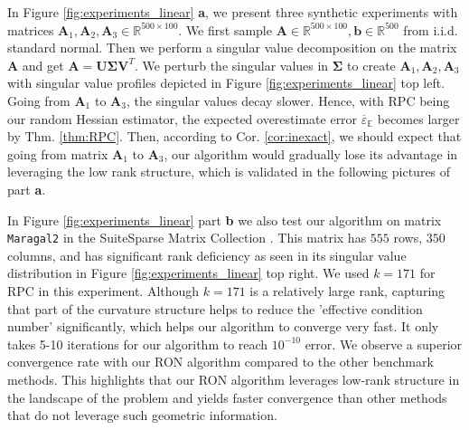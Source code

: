 \documentclass[11pt]{amsart}
\theoremstyle{plain}
\theoremstyle{definition}
\theoremstyle{remark}
\def\R{\mathbb{R}}
\def\E{\mathbb{E}}
\def\eps{\varepsilon}
\def\A{\mathbf{A}}
\begin{document}
In Figure \ref{fig:experiments_linear} \textbf{a}, we present three synthetic experiments with matrices $\A_{1},\A_{2},\A_{3}\in\R^{500\times 100}$. We first sample $\A\in \R^{500\times 100}, \mathbf{b}\in \R^{500}$ from i.i.d. standard normal. Then we perform a singular value decomposition on the matrix $\A$ and get $\A=\mathbf{U}\mathbf{\Sigma}\mathbf{V}^T.$ We perturb the singular values in $\mathbf{\Sigma}$ to create  $\A_{1},\A_{2},\A_{3}$ with singular value profiles depicted in Figure \ref{fig:experiments_linear} top left. Going from $\A_{1}$ to $\A_{3}$, the singular values decay slower. Hence, with RPC being our random Hessian estimator, the expected overestimate error $\overline{\eps}_{\E}$ becomes larger by Thm. \ref{thm:RPC}. Then, according to Cor. \ref{cor:inexact}, we should expect that going from matrix $\A_1$ to $\A_3$, our algorithm would gradually lose its advantage in leveraging the low rank structure, which is validated in the following pictures of part \textbf{a}.

In Figure \ref{fig:experiments_linear} part \textbf{b} we also test our algorithm on matrix \texttt{Maragal2} %
in the SuiteSparse Matrix Collection 
\cite{kolodziej2019suitesparse}. This matrix has $555$ rows, $350$ columns, and has significant rank deficiency as seen in its singular value distribution in Figure \ref{fig:experiments_linear} top right. We used $k=171$ for RPC in this experiment. Although $k=171$ is a relatively large rank, capturing that part of the curvature structure helps to reduce the 'effective condition number' significantly, which helps our algorithm to converge very fast. It only takes 5-10 iterations for our algorithm to reach $10^{-10}$ error. We observe a superior convergence rate with our RON algorithm compared to the other benchmark methods. This highlights that our RON algorithm leverages low-rank structure in the landscape of the problem and yields faster convergence than other methods that do not leverage such geometric information. 

\end{document}
